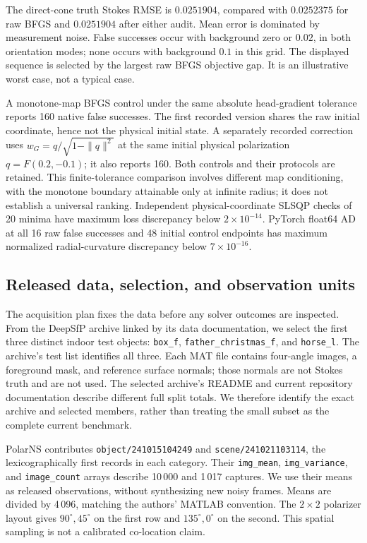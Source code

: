 The direct-cone truth Stokes RMSE is $0.0251904$, compared with $0.0252375$ for raw BFGS and $0.0251904$ after either audit. Mean error is dominated by measurement noise. False successes occur with background zero or $0.02$, in both orientation modes; none occurs with background $0.1$ in this grid. The displayed sequence is selected by the largest raw BFGS objective gap. It is an illustrative worst case, not a typical case.

A monotone-map BFGS control under the same absolute head-gradient tolerance reports 160 native false successes. The first recorded version shares the raw initial coordinate, hence not the physical initial state. A separately recorded correction uses $w_G=q/\sqrt{1-\|q\|^2}$ at the same initial physical polarization $q=F(0.2,-0.1)$; it also reports 160. Both controls and their protocols are retained. This finite-tolerance comparison involves different map conditioning, with the monotone boundary attainable only at infinite radius; it does not establish a universal ranking. Independent physical-coordinate SLSQP checks of 20 minima have maximum loss discrepancy below $2\times10^{-14}$. PyTorch float64 AD at all 16 raw false successes and 48 initial control endpoints has maximum normalized radial-curvature discrepancy below $7\times10^{-16}$.

\subsection{Released data, selection, and observation units}
The acquisition plan fixes the data before any solver outcomes are inspected. From the DeepSfP archive linked by its data documentation, we select the first three distinct indoor test objects: \nolinkurl{box_f}, \nolinkurl{father_christmas_f}, and \nolinkurl{horse_l}. The archive's test list identifies all three. Each MAT file contains four-angle images, a foreground mask, and reference surface normals; those normals are not Stokes truth and are not used. The selected archive's README and current repository documentation describe different full split totals. We therefore identify the exact archive and selected members, rather than treating the small subset as the complete current benchmark.

PolarNS contributes \nolinkurl{object/241015104249} and \nolinkurl{scene/241021103114}, the lexicographically first records in each category. Their \nolinkurl{img_mean}, \nolinkurl{img_variance}, and \nolinkurl{image_count} arrays describe 10\,000 and 1\,017 captures. We use their means as released observations, without synthesizing new noisy frames. Means are divided by 4\,096, matching the authors' MATLAB convention. The $2\times2$ polarizer layout gives $90^{\circ},45^{\circ}$ on the first row and $135^{\circ},0^{\circ}$ on the second. This spatial sampling is not a calibrated co-location claim.

